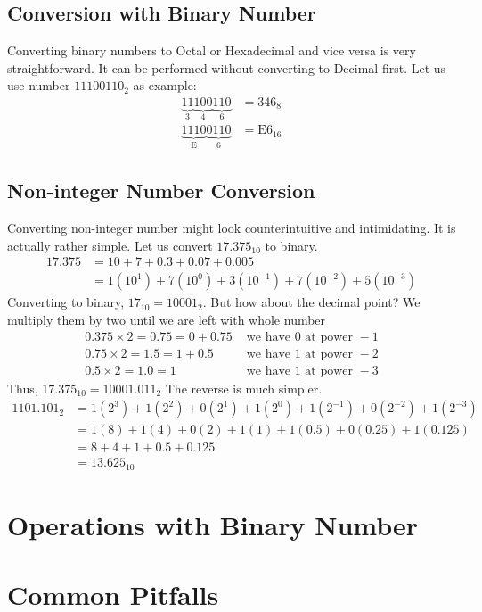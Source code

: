 \subsection{Conversion with Binary Number}
\noindent Converting binary numbers to Octal or Hexadecimal and vice versa is very straightforward. It can be performed without converting to Decimal first. Let us use number $11100110_2$ as example:
\begin{equation} \label{eq7}
\begin{split}
\underbrace{11}_\text{3}\underbrace{100}_\text{4}\underbrace{110}_\text{6} & = 346_8\\
\underbrace{1110}_\text{E}\underbrace{0110}_\text{6} & = \text{E}6_{16}
\end{split}
\end{equation}
\subsection{Non-integer Number Conversion}
Converting non-integer number might look counterintuitive and intimidating. It is actually rather simple. Let us convert $17.375_{10}$ to binary.
\[\begin{split}
17.375 & = 10 + 7 + 0.3+0.07+0.005 \\
& = 1(10^1) + 7(10^0) + 3(10^{-1}) + 7(10^{-2})+5(10^{-3})
\end{split}\]
Converting to binary, $17_{10} = 10001_2$. But how about the decimal point?
We multiply them by two until we are left with whole number
\begin{equation} \label{eq8}
\begin{split}
0.375 \times 2  = 0.75 = 0+0.75 & \text{ we have 0 at power }-1\\
0.75 \times 2  = 1.5 = 1+0.5 & \text{ we have 1 at power }-2\\
0.5 \times 2  = 1.0 = 1 & \text{ we have 1 at power }-3
\end{split}
\end{equation} 
Thus, $17.375_{10} = 10001.011_2$\newline
The reverse is much simpler.
\begin{equation} \label{eq2}
\begin{split}
1101.101_2 & = 1(2^3)+1(2^2)+0(2^1)+1(2^0)+1(2^{-1})+0(2^{-2})+1(2^{-3}) \\
& = 1(8)+1(4)+0(2)+1(1)+1(0.5)+0(0.25)+1(0.125) \\
& = 8 + 4 + 1+ 0.5+0.125 \\
& = 13.625_{10}
\end{split}
\end{equation} 
\section{Operations with Binary Number}
\section{Common Pitfalls}